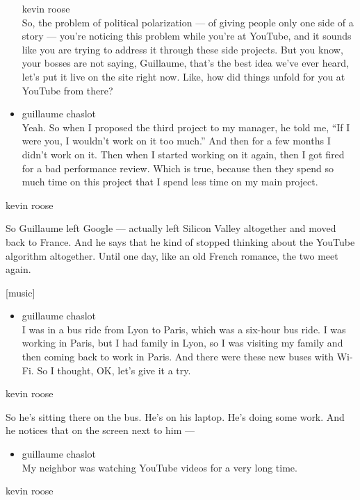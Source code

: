 \begin{itemize}
  kevin roose\\
  So, the problem of political polarization --- of giving people only
  one side of a story --- you're noticing this problem while you're at
  YouTube, and it sounds like you are trying to address it through these
  side projects. But you know, your bosses are not saying, Guillaume,
  that's the best idea we've ever heard, let's put it live on the site
  right now. Like, how did things unfold for you at YouTube from there?
\item
  guillaume chaslot\\
  Yeah. So when I proposed the third project to my manager, he told me,
  ``If I were you, I wouldn't work on it too much.'' And then for a few
  months I didn't work on it. Then when I started working on it again,
  then I got fired for a bad performance review. Which is true, because
  then they spend so much time on this project that I spend less time on
  my main project.
\end{itemize}

kevin roose

So Guillaume left Google --- actually left Silicon Valley altogether and
moved back to France. And he says that he kind of stopped thinking about
the YouTube algorithm altogether. Until one day, like an old French
romance, the two meet again.

{[}music{]}

\begin{itemize}
\tightlist
\item
  guillaume chaslot\\
  I was in a bus ride from Lyon to Paris, which was a six-hour bus ride.
  I was working in Paris, but I had family in Lyon, so I was visiting my
  family and then coming back to work in Paris. And there were these new
  buses with Wi-Fi. So I thought, OK, let's give it a try.
\end{itemize}

kevin roose

So he's sitting there on the bus. He's on his laptop. He's doing some
work. And he notices that on the screen next to him ---

\begin{itemize}
\tightlist
\item
  guillaume chaslot\\
  My neighbor was watching YouTube videos for a very long time.
\end{itemize}

kevin roose

